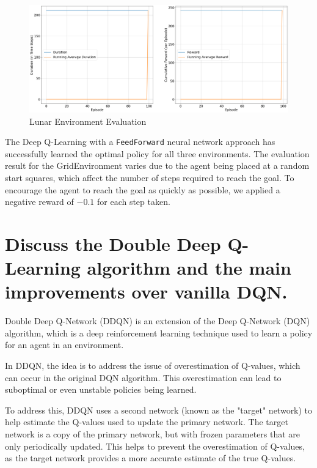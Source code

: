 \documentclass{article} %
\begin{document}
\begin{figure}[H]
    \begin{center}
        \includegraphics[width=\textwidth]{lunar_evaluate.png}
    \end{center}
    \caption{Lunar Environment Evaluation}
\end{figure}

The Deep Q-Learning \cite{mnih2013playing} with a \verb|FeedForward| neural network approach has successfully learned the optimal
policy for all three environments. The evaluation result for the GridEnvironment varies
due to the agent being placed at a random start squares, which affect the number of steps
required to reach the goal. To encourage the agent to reach the goal as quickly as possible,
we applied a negative reward of $-0.1$ for each step taken.


\section{Discuss the Double Deep Q-Learning algorithm and the main improvements over vanilla DQN.}
Double Deep Q-Network (DDQN) \cite{van2016deep} is an extension of the Deep Q-Network (DQN) algorithm, which is a deep reinforcement learning technique used to learn a policy for an agent in an environment.

In DDQN, the idea is to address the issue of overestimation of Q-values, which can occur in the original DQN algorithm. This overestimation can lead to suboptimal or even unstable policies being learned.

To address this, DDQN uses a second network (known as the "target" network) to help estimate the Q-values used to update the primary network. The target network is a copy of the primary network, but with frozen parameters that are only periodically updated. This helps to prevent the overestimation of Q-values, as the target network provides a more accurate estimate of the true Q-values.
\end{document}
